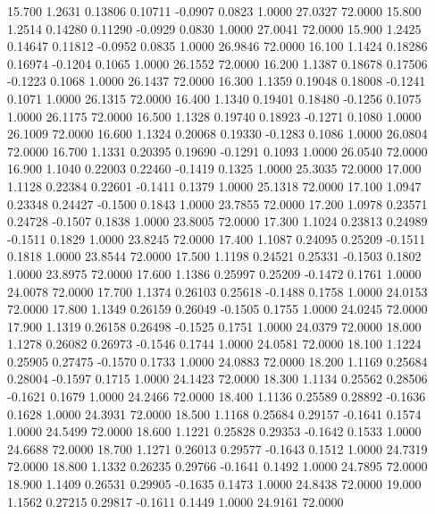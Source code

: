   15.700   1.2631   0.13806   0.10711  -0.0907   0.0823   1.0000  27.0327  72.0000
  15.800   1.2514   0.14280   0.11290  -0.0929   0.0830   1.0000  27.0041  72.0000
  15.900   1.2425   0.14647   0.11812  -0.0952   0.0835   1.0000  26.9846  72.0000
  16.100   1.1424   0.18286   0.16974  -0.1204   0.1065   1.0000  26.1552  72.0000
  16.200   1.1387   0.18678   0.17506  -0.1223   0.1068   1.0000  26.1437  72.0000
  16.300   1.1359   0.19048   0.18008  -0.1241   0.1071   1.0000  26.1315  72.0000
  16.400   1.1340   0.19401   0.18480  -0.1256   0.1075   1.0000  26.1175  72.0000
  16.500   1.1328   0.19740   0.18923  -0.1271   0.1080   1.0000  26.1009  72.0000
  16.600   1.1324   0.20068   0.19330  -0.1283   0.1086   1.0000  26.0804  72.0000
  16.700   1.1331   0.20395   0.19690  -0.1291   0.1093   1.0000  26.0540  72.0000
  16.900   1.1040   0.22003   0.22460  -0.1419   0.1325   1.0000  25.3035  72.0000
  17.000   1.1128   0.22384   0.22601  -0.1411   0.1379   1.0000  25.1318  72.0000
  17.100   1.0947   0.23348   0.24427  -0.1500   0.1843   1.0000  23.7855  72.0000
  17.200   1.0978   0.23571   0.24728  -0.1507   0.1838   1.0000  23.8005  72.0000
  17.300   1.1024   0.23813   0.24989  -0.1511   0.1829   1.0000  23.8245  72.0000
  17.400   1.1087   0.24095   0.25209  -0.1511   0.1818   1.0000  23.8544  72.0000
  17.500   1.1198   0.24521   0.25331  -0.1503   0.1802   1.0000  23.8975  72.0000
  17.600   1.1386   0.25997   0.25209  -0.1472   0.1761   1.0000  24.0078  72.0000
  17.700   1.1374   0.26103   0.25618  -0.1488   0.1758   1.0000  24.0153  72.0000
  17.800   1.1349   0.26159   0.26049  -0.1505   0.1755   1.0000  24.0245  72.0000
  17.900   1.1319   0.26158   0.26498  -0.1525   0.1751   1.0000  24.0379  72.0000
  18.000   1.1278   0.26082   0.26973  -0.1546   0.1744   1.0000  24.0581  72.0000
  18.100   1.1224   0.25905   0.27475  -0.1570   0.1733   1.0000  24.0883  72.0000
  18.200   1.1169   0.25684   0.28004  -0.1597   0.1715   1.0000  24.1423  72.0000
  18.300   1.1134   0.25562   0.28506  -0.1621   0.1679   1.0000  24.2466  72.0000
  18.400   1.1136   0.25589   0.28892  -0.1636   0.1628   1.0000  24.3931  72.0000
  18.500   1.1168   0.25684   0.29157  -0.1641   0.1574   1.0000  24.5499  72.0000
  18.600   1.1221   0.25828   0.29353  -0.1642   0.1533   1.0000  24.6688  72.0000
  18.700   1.1271   0.26013   0.29577  -0.1643   0.1512   1.0000  24.7319  72.0000
  18.800   1.1332   0.26235   0.29766  -0.1641   0.1492   1.0000  24.7895  72.0000
  18.900   1.1409   0.26531   0.29905  -0.1635   0.1473   1.0000  24.8438  72.0000
  19.000   1.1562   0.27215   0.29817  -0.1611   0.1449   1.0000  24.9161  72.0000
